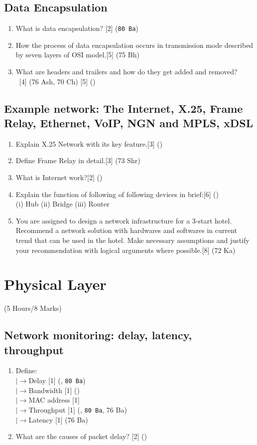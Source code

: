 \documentclass[12pt]{article}
\newcommand{\lb}{\\$\left|\rightarrow\right.$}
\newcommand{\enter}{\\\textcolor{white}{1}}
\begin{document}
\subsection{Data Encapsulation}
\begin{enumerate}[noitemsep, topsep = 0pt]
	\item What is data encapsulation? \hfill [2] (\texttt{80 Ba})
	
	\item How the process of data encapsulation occurs in transmission mode described by seven layers of OSI model.\hfill[5] (75 Bh)

	\item What are headers and trailers and how do they get added and removed?
\enter\hfill[4] (76 Ash, 70 Ch) [5] () 
\end{enumerate}

\subsection{Example network: The Internet, X.25, Frame Relay, Ethernet, VoIP, NGN and MPLS, xDSL}
\begin{enumerate}[noitemsep, topsep = 0pt]
\item Explain X.25 Network with its key feature.\hfill[3] ()
\item Define Frame Relay in detail.\hfill[3] (73 Shr)
\item What is Internet work?\hfill[2] ()
\item Explain the function of following of following devices in brief:\hfill[6] ()\\
(i) Hub (ii) Bridge (iii) Router
\item You are assigned to design a network infrastructure for a 3-start hotel. Recommend a network solution with hardwares and softwares in current trend that can be used in the hotel. Make necessary assumptions and justify your recommendation with logical arguments where possible.\hfill[8] (72 Ka)
\end{enumerate}

\pagebreak
\section{Physical Layer}
\begin{center}(5 Hours/8 Marks)\end{center}
\subsection{Network monitoring: delay, latency, throughput}
\begin{enumerate}[noitemsep, topsep=0pt]	
	\item Define:
	\lb Delay \hfill [1] (, \texttt{80 Ba})
	\lb Bandwidth \hfill [1] ()
	\lb MAC address \hfill [1] 
	\lb Throughput \hfill [1] (, \texttt{80 Ba}, 76 Ba)
	\lb Latency \hfill [1] (76 Ba)
	
	\item What are the causes of packet delay? \hfill [2] ()
\end{enumerate}
\end{document}
